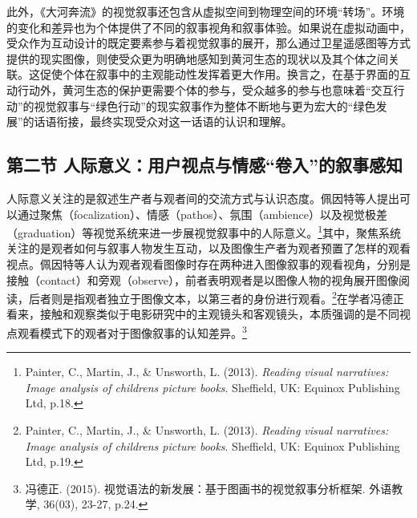 此外，《大河奔流》的视觉叙事还包含从虚拟空间到物理空间的环境``转场''。环境的变化和差异也为个体提供了不同的叙事视角和叙事体验。如果说在虚拟动画中，受众作为互动设计的既定要素参与着视觉叙事的展开，那么通过卫星遥感图等方式提供的现实图像，则使受众更为明确地感知到黄河生态的现状以及其个体之间关联。这促使个体在叙事中的主观能动性发挥着更大作用。换言之，在基于界面的互动行动外，黄河生态的保护更需要个体的参与，受众越多的参与也意味着``交互行动''的视觉叙事与``绿色行动''的现实叙事作为整体不断地与更为宏大的``绿色发展''的话语衔接，最终实现受众对这一话语的认识和理解。

\subsection{第二节
人际意义：用户视点与情感``卷入''的叙事感知}\label{ux7b2cux4e8cux8282-ux4ebaux9645ux610fux4e49ux7528ux6237ux89c6ux70b9ux4e0eux60c5ux611fux5377ux5165ux7684ux53d9ux4e8bux611fux77e5}

人际意义关注的是叙述生产者与观者间的交流方式与认识态度。佩因特等人提出可以通过聚焦（focalization）、情感（pathos）、氛围（ambience）以及视觉极差（graduation）等视觉系统来进一步展视觉叙事中的人际意义。\footnote{Painter,
  C., Martin, J., \& Unsworth, L. (2013). \emph{Reading visual
  narratives: Image analysis of children\textquotesingle s picture
  books}. Sheffield, UK: Equinox Publishing Ltd, p.18.}其中，聚焦系统关注的是观者如何与叙事人物发生互动，以及图像生产者为观者预置了怎样的观看视点。佩因特等人认为观者观看图像时存在两种进入图像叙事的观看视角，分别是接触（contact）和旁观（observe），前者表明观者是以图像人物的视角展开图像阅读，后者则是指观者独立于图像文本，以第三者的身份进行观看。\footnote{Painter,
  C., Martin, J., \& Unsworth, L. (2013). \emph{Reading visual
  narratives: Image analysis of children\textquotesingle s picture
  books}. Sheffield, UK: Equinox Publishing Ltd, p.19.}在学者冯德正看来，接触和观察类似于电影研究中的主观镜头和客观镜头，本质强调的是不同视点观看模式下的观者对于图像叙事的认知差异。\footnote{冯德正.
  (2015). 视觉语法的新发展：基于图画书的视觉叙事分析框架. 外语教学,
  36(03), 23-27, p.24.}

